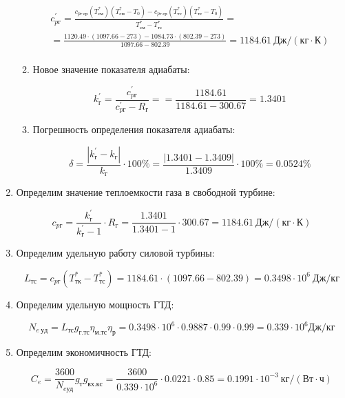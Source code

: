 \documentclass[a4paper,12pt]{article}
\begin{document}
\begin{enumerate}
\begin{enumerate}
		\begin{gather*}
		    c_{pг}^\prime = \frac{
			c_{pг\ ср}(T_{см}^*) (T_{см}^* - T_0) - c_{pг\ ср}(T_{тс}^*) (T_{тс}^* - T_0)
		}{
			T_{см}^* - T_{тс}^*} =\\
		    = \frac{
			1120.49 \cdot (1097.66 - 273) -
			1084.73 \cdot (802.39 - 273)
		}{
			1097.66 - 802.39} =
			1184.61 \ Дж / (кг \cdot К)\\
		\end{gather*}
		
		\item Новое значение показателя адиабаты:
		
		\[
		k_{г}^\prime = \frac{ c_{pг}^\prime }{ c_{pг}^\prime - R_г } = 
				= \frac{ 1184.61 }{ 1184.61 - 300.67} =
				1.3401
		\]
		
		\item Погрешность определения показателя адиабаты:
		
		\[
		\delta = \frac{ \left| k_{г}^\prime - k_{г} \right| }{ k_{г} } \cdot 100 \% =
				\frac{ \left|  1.3401 - 1.3409 \right| }{ 1.3409 } \cdot 100 \% =
				0.0524 \%
		\]
	
	\end{enumerate}
	
	\item Определим значение теплоемкости газа в свободной турбине:
	
	\[
	c_{pг} = \frac{ k_г^\prime }{ k_г^\prime - 1 } \cdot R_г = 
			\frac{ 1.3401 }{ 1.3401 - 1 } \cdot 300.67
			= 1184.61\ Дж/(кг \cdot К)
	\]
	
	\item Определим удельную работу силовой турбины:
	
	\[
	L_{тс} = c_{pг} ( T_{тк}^* -  T_{тс}^*) = 
		1184.61 \cdot ( 1097.66 -  802.39 ) = 
		0.3498 \cdot 10^6\ Дж/кг
	\]
	
	\item Определим удельную мощность ГТД:
	
	
	
	\[
	N_{e\ уд} = L_{тс} g_{г.тс} \eta_{м.тс} \eta_р = 
			0.3498 \cdot 10^6 \cdot 0.9887 \cdot 0.99 \cdot 0.99 =
	0.339 \cdot 10^6 Дж/кг
	\]
	
	\item Определим экономичность ГТД:
	
	
	
	\[
	C_e = \frac{ 3600 }{ N_{e уд} } g_т g_{вх.кс} = 
			\frac{ 3600 }{ 0.339 \cdot 10^6} \cdot 0.0221 \cdot 0.85 =
	0.1991 \cdot 10^{-3}\ кг/\left( Вт \cdot ч \right)
	\]
	

\end{enumerate}
\end{document}
